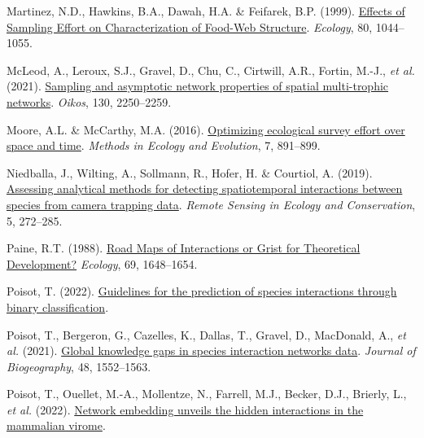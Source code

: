 \documentclass[10pt,oneside]{article}
\newlength{\cslhangindent}
\newenvironment{CSLReferences}[3] %
 {%
  \setlength{\parindent}{0pt}
  \ifodd #1 \everypar{\setlength{\hangindent}{\cslhangindent}}\ignorespaces\fi
  \ifnum #2 > 0
  \setlength{\parskip}{#2\baselineskip}
  \fi
 }%
 {}
\begin{document}
\begin{CSLReferences}{1}{0}
\leavevmode{}%
Martinez, N.D., Hawkins, B.A., Dawah, H.A. \& Feifarek, B.P. (1999).
\href{https://doi.org/10.1890/0012-9658(1999)080\%5B1044:EOSEOC\%5D2.0.CO;2}{Effects
of Sampling Effort on Characterization of Food-Web Structure}.
\emph{Ecology}, 80, 1044--1055.

\leavevmode{}%
McLeod, A., Leroux, S.J., Gravel, D., Chu, C., Cirtwill, A.R., Fortin,
M.-J., \emph{et al.} (2021).
\href{https://doi.org/10.1111/oik.08650}{Sampling and asymptotic network
properties of spatial multi-trophic networks}. \emph{Oikos}, 130,
2250--2259.

\leavevmode{}%
Moore, A.L. \& McCarthy, M.A. (2016).
\href{https://doi.org/10.1111/2041-210X.12564}{Optimizing ecological
survey effort over space and time}. \emph{Methods in Ecology and
Evolution}, 7, 891--899.

\leavevmode{}%
Niedballa, J., Wilting, A., Sollmann, R., Hofer, H. \& Courtiol, A.
(2019). \href{https://doi.org/10.1002/rse2.107}{Assessing analytical
methods for detecting spatiotemporal interactions between species from
camera trapping data}. \emph{Remote Sensing in Ecology and
Conservation}, 5, 272--285.

\leavevmode{}%
Paine, R.T. (1988). \href{https://doi.org/10.2307/1941141}{Road Maps of
Interactions or Grist for Theoretical Development?} \emph{Ecology}, 69,
1648--1654.

\leavevmode{}%
Poisot, T. (2022).
\href{https://doi.org/10.32942/osf.io/aty7n}{Guidelines for the
prediction of species interactions through binary classification}.

\leavevmode{}%
Poisot, T., Bergeron, G., Cazelles, K., Dallas, T., Gravel, D.,
MacDonald, A., \emph{et al.} (2021).
\href{https://doi.org/10.1111/jbi.14127}{Global knowledge gaps in
species interaction networks data}. \emph{Journal of Biogeography}, 48,
1552--1563.

\leavevmode{}%
Poisot, T., Ouellet, M.-A., Mollentze, N., Farrell, M.J., Becker, D.J.,
Brierly, L., \emph{et al.} (2022).
\href{https://doi.org/10.48550/arXiv.2105.14973}{Network embedding
unveils the hidden interactions in the mammalian virome}.


\end{CSLReferences}
\end{document}
